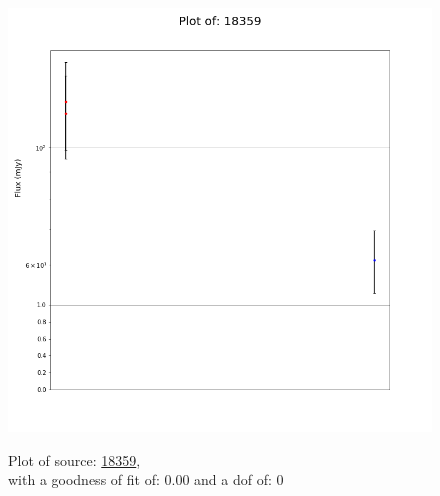 \documentclass{article}
\begin{document}
\begin{figure}[H]
    \centering
    \begin{minipage}{.5\textwidth}
        \centering
        \includegraphics[scale = 0.35]{KmeulenTrap4P23_1min/1min18359.png}
        \captionsetup{labelformat=empty}
        \caption{Plot of source: \href{http://banana.transientskp.org/r4/vlo_KmeulenTrap4P23/runningcatalog/18359}{18359},\\with a goodness of fit of: 0.00 and a dof of: 0}
        \addtocounter{figure}{-1}
        \label{KmeulenTrap4P23:1min:18359:plot}
    \end{minipage}%
    \begin{minipage}{0.5\textwidth}
        \centering


\end{minipage}
\end{figure}
\end{document}

